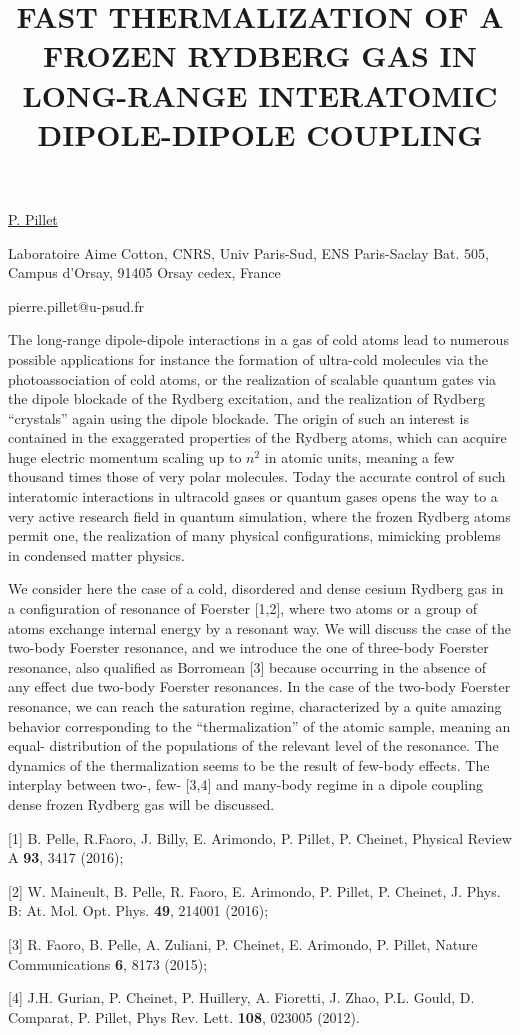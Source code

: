 \title{FAST THERMALIZATION OF A FROZEN RYDBERG GAS IN LONG-RANGE INTERATOMIC DIPOLE-DIPOLE COUPLING}

\underline{P. Pillet} 

{\normalsize{\vspace{-4mm}
Laboratoire Aime Cotton, CNRS, Univ Paris-Sud, ENS Paris-Saclay
Bat. 505, Campus d'Orsay, 91405 Orsay cedex, France

\email pierre.pillet@u-psud.fr}}

The long-range dipole-dipole interactions in a gas of cold atoms lead to numerous possible applications for instance the formation of ultra-cold molecules via the photoassociation of cold atoms, or the realization of scalable quantum gates via the dipole blockade of the Rydberg excitation, and the realization of Rydberg ``crystals'' again using the dipole blockade. The origin of such an interest is contained in the exaggerated properties of the Rydberg atoms, which can acquire huge electric momentum scaling up to $n^2$ in atomic units, meaning a few thousand times those of very polar molecules. Today the accurate control of such interatomic interactions in ultracold gases or quantum gases opens the way to a very active research field in quantum simulation, where the frozen Rydberg atoms permit one, the realization of many physical configurations, mimicking problems in condensed matter physics.

We consider here the case of a cold, disordered and dense cesium Rydberg gas in a configuration of resonance of Foerster [1,2], where two atoms or a group of atoms exchange internal energy by a resonant way. We will discuss the case of the two-body Foerster resonance, and we introduce the one of three-body Foerster resonance, also qualified as Borromean [3] because occurring in the absence of any effect due two-body Foerster resonances. In the case of the two-body Foerster resonance, we can reach the saturation regime, characterized by a quite amazing behavior corresponding to the ``thermalization'' of the atomic sample, meaning an equal- distribution of the populations of the relevant level of the resonance. The dynamics of the thermalization seems to be the result of few-body effects. The interplay between two-, few- [3,4] and many-body regime in a dipole coupling dense frozen Rydberg gas will be discussed.

{\normalsize
[1] B. Pelle, R.Faoro, J. Billy, E. Arimondo, P. Pillet, P. Cheinet, Physical Review A \textbf{93}, 3417 (2016);
\vsp

[2] W. Maineult, B. Pelle, R. Faoro, E. Arimondo, P. Pillet, P. Cheinet, J. Phys. B: At. Mol. Opt. Phys. \textbf{49}, 214001 (2016);
\vsp

[3] R. Faoro, B. Pelle, A. Zuliani, P. Cheinet, E. Arimondo, P. Pillet, Nature Communications \textbf{6}, 8173 (2015);
\vsp

[4] J.H. Gurian, P. Cheinet, P. Huillery, A. Fioretti, J. Zhao, P.L. Gould, D. Comparat, P. Pillet, Phys Rev. Lett. \textbf{108}, 023005 (2012).
}

\vspace{\baselineskip} 